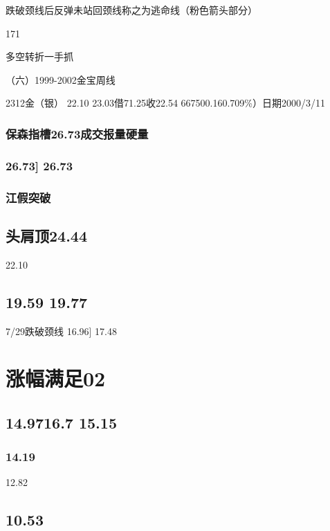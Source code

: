 \documentclass{article}
\begin{document}
跌破颈线后反弹未站回颈线称之为逃命线（粉色箭头部分）

171

\clearpage

多空转折一手抓

（六）1999-2002金宝周线

2312金（银） 22.10 23.03借71.25收22.54 667500.160.709\%）日期2000/3/11

\subsubsection{保森指槽26.73成交报量硬量}

\subsubsection{26.73] 26.73}

\subsubsection{江假突破}

\subsection{头肩顶24.44}

22.10

\subsection{19.59 19.77}

7/29跌破颈线 16.96] 17.48

\section{涨幅满足02}

\subsection{14.9716.7 15.15}

\subsubsection{14.19}

12.82

\subsection{10.53}
\end{document}
